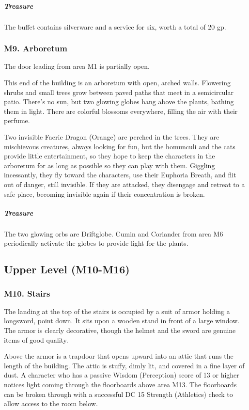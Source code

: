 \documentclass[10pt,a4paper,twoside,bg=print,twocolumn,openany,nodeprecatedcode]{dndbook}
\begin{document}
\subparagraph{Treasure}
The buffet contains silverware and a service for six, worth a total of 20 gp.

\subsubsection{M9. Arboretum}
The door leading from area M1 is partially open.

\begin{DndReadAloud}{}
This end of the building is an arboretum with open, arched walls. Flowering shrubs and small trees grow between paved paths that meet in a semicircular patio. There's no sun, but two glowing globes hang above the plants, bathing them in light. There are colorful blossoms everywhere, filling the air with their perfume.

\end{DndReadAloud}

Two invisible Faerie Dragon (Orange) are perched in the trees. They are mischievous creatures, always looking for fun, but the homunculi and the cats provide little entertainment, so they hope to keep the characters in the arboretum for as long as possible so they can play with them. Giggling incessantly, they fly toward the characters, use their Euphoria Breath, and flit out of danger, still invisible. If they are attacked, they disengage and retreat to a safe place, becoming invisible again if their concentration is broken.

\subparagraph{Treasure}
The two glowing orbs are Driftglobe. Cumin and Coriander from area M6 periodically activate the globes to provide light for the plants.

\subsection{Upper Level (M10-M16)}
\subsubsection{M10. Stairs}
The landing at the top of the stairs is occupied by a suit of armor holding a longsword, point down. It sits upon a wooden stand in front of a large window. The armor is clearly decorative, though the helmet and the sword are genuine items of good quality.

Above the armor is a trapdoor that opens upward into an attic that runs the length of the building. The attic is stuffy, dimly lit, and covered in a fine layer of dust. A character who has a passive Wisdom (Perception) score of 13 or higher notices light coming through the floorboards above area M13. The floorboards can be broken through with a successful DC 15 Strength (Athletics) check to allow access to the room below.
\end{document}
